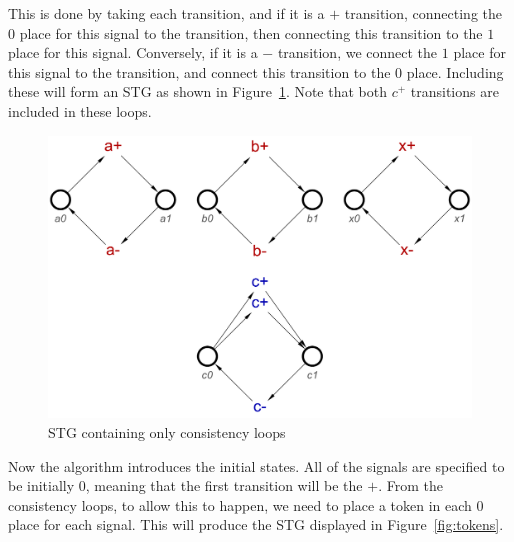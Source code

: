\documentclass[british,conference,compsoc]{IEEEtran}
\begin{document}
This is done by taking each transition, and if it is a $+$ transition, connecting 
the $0$ place for this signal to the transition, then connecting this transition to 
the $1$ place for this signal. Conversely, if it is a $-$ transition, we connect the
$1$ place for this signal to the transition, and connect this transition to the $0$ 
place. Including these will form an STG as shown in Figure~\ref{fig:loops}. Note
that both $c^{+}$ transitions are included in these loops.

\begin{figure}[h]
\begin{centering}
\includegraphics[scale=0.25]{Images/or-gate-ctrl-loops-stg}
\par\end{centering}
\protect\caption{\label{fig:loops} STG containing only consistency loops}
\end{figure}

Now the algorithm introduces the initial states. All of the signals are specified
to be initially 0, meaning that the first transition will be the $+$. From the
consistency loops, to allow this to happen, we need to place a token in each 
$0$ place for each signal. This will produce the STG displayed in Figure~\ref{fig:tokens}.
\end{document}
